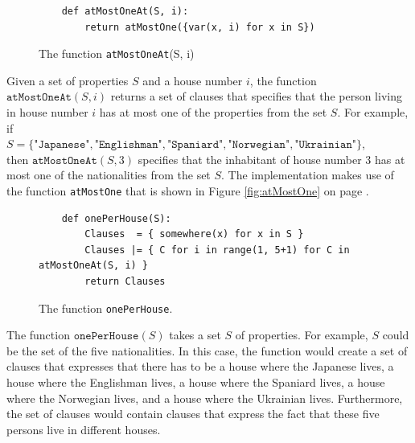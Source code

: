 \begin{figure}[!ht]
\centering
\begin{verbatim}
    def atMostOneAt(S, i):
        return atMostOne({var(x, i) for x in S})
\end{verbatim}
\vspace*{-0.3cm}
\caption{The function \texttt{atMostOneAt}(S, i)}
\label{fig:atMostOneAt}
\end{figure}

Given a set of properties $S$ and a house number $i$, the function
$\texttt{atMostOneAt}(S, i)$ returns a set of clauses that specifies that the
person living in house number $i$ has at most one of the properties from the set
$S$.  For example, if  
\\[0.2cm]
\hspace*{1.3cm}
$S = \{\texttt{"Japanese"}, \texttt{"Englishman"}, \texttt{"Spaniard"}, \texttt{"Norwegian"}, \texttt{"Ukrainian"}\}$, 
\\[0.2cm]
then $\texttt{atMostOneAt}(S, 3)$ specifies that the inhabitant of house number 3
has at most one of the nationalities from the set $S$.   The implementation
makes use of the function \texttt{atMostOne} that is shown in Figure
\ref{fig:atMostOne} on page \pageref{fig:atMostOne}.

\begin{figure}[!ht]
\centering
\begin{verbatim}
    def onePerHouse(S):
        Clauses  = { somewhere(x) for x in S } 
        Clauses |= { C for i in range(1, 5+1) for C in atMostOneAt(S, i) }
        return Clauses
\end{verbatim}
\vspace*{-0.3cm}
\caption{The function \texttt{onePerHouse}.}
\label{fig:onePerHouse}
\end{figure}

The function $\texttt{onePerHouse}(S)$ takes a set $S$ of properties.  For
example, $S$ could be the set of the five nationalities.
In this case, the function would create a set of clauses that expresses that
there has to be a house where the Japanese lives, a house where the Englishman
lives, a house where the Spaniard lives, a house where the Norwegian lives, and
a house where the Ukrainian lives.  Furthermore, the set of clauses would contain
clauses that express the fact that these five persons live in different houses.


